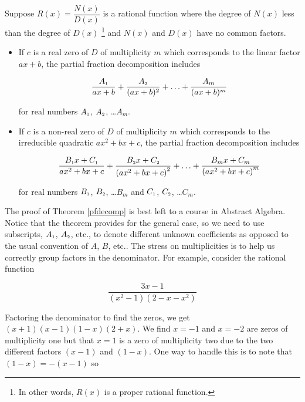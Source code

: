 \colorbox{ResultColor}{\bbm

\begin{thm}  \label{pfdecomp} Suppose $R(x) = \dfrac{N(x)}{D(x)}$ is a rational function where the degree of $N(x)$ less than the degree of $D(x)$ \footnote{In other words, $R(x)$ is a proper rational function.}  and $N(x)$ and $D(x)$ have no common factors.

\begin{itemize}

\item  If $c$ is a real zero of $D$ of multiplicity $m$ which corresponds to the linear factor $ax+b$, the partial fraction decomposition includes

\[ \dfrac{A_{\mbox{\tiny$1$}}}{ax+b} + \dfrac{A_{\mbox{\tiny$2$}}}{(ax+b)^2} + \ldots + \dfrac{A_{m}}{(ax+b)^m} \]

for real numbers $A_{\mbox{\tiny$1$}}$, $A_{\mbox{\tiny$2$}}$, \ldots $A_{m}$.

\item  If $c$ is a non-real zero of $D$ of multiplicity $m$ which corresponds to the irreducible quadratic $ax^2+bx+c$, the partial fraction decomposition includes  

\[ \dfrac{B_{\mbox{\tiny$1$}}x + C_{\mbox{\tiny$1$}}}{ax^2+bx+c} + \dfrac{B_{\mbox{\tiny$2$}}x + C_{\mbox{\tiny$2$}}}{\left(ax^2+bx+c\right)^2} + \ldots +\dfrac{B_{m}x + C_{m}}{\left(ax^2+bx+c\right)^m} \]

for real numbers $B_{\mbox{\tiny$1$}}$, $B_{\mbox{\tiny$2$}}$, \ldots $B_{m}$ and $C_{\mbox{\tiny$1$}}$, $C_{\mbox{\tiny$2$}}$, \ldots $C_{m}$. 

\end{itemize}


\end{thm}

\ebm}


\smallskip

The proof of Theorem \ref{pfdecomp} is best left to a course in Abstract Algebra.  Notice that the theorem provides for the general case, so we need to use subscripts, $A_{\mbox{\tiny$1$}}$, $A_{\mbox{\tiny$2$}}$, etc.,  to denote different unknown coefficients as opposed to the usual convention of $A$, $B$, etc..  The stress on multiplicities is to help us correctly group factors in the denominator.  For example, consider the rational function

\[\dfrac{3x-1}{\left(x^2-1\right)\left(2-x-x^2\right)}\]

Factoring the denominator to find the zeros, we get $(x+1)(x-1)(1-x)(2+x)$.  We find $x = -1$ and $x=-2$ are zeros of multiplicity one but that $x=1$ is a zero of multiplicity two due to the two different factors $(x-1)$ and $(1-x)$.  One way to handle this is to note that $(1-x) = -(x-1)$ so 

